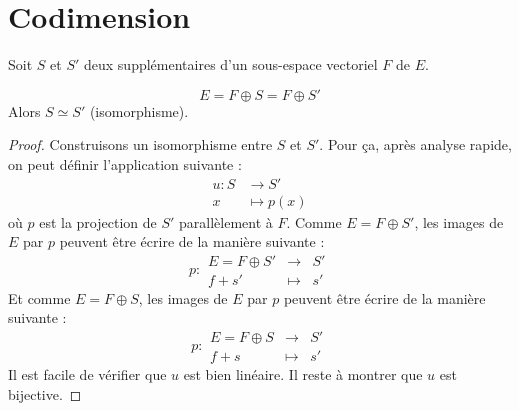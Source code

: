 \documentclass[11pt,a4paper]{report}
\begin{document}
\MakeSwissCover

\tableofcontents

\chapter{Codimension}

\begin{proposition}
    Soit $S$ et $S'$ deux supplémentaires d'un sous-espace vectoriel $F$ de $E$.
    
    $$E = F \oplus S = F \oplus S'$$
    Alors $S \simeq S'$ (isomorphisme).
\end{proposition}

\begin{proof}
    Construisons un isomorphisme entre $S$ et $S'$. Pour ça, après analyse rapide, on peut définir l'application suivante :
    \begin{align*}
        u : S &\longrightarrow S' \\
        x &\longmapsto p(x)
    \end{align*}
    où $p$ est la projection de $S'$ parallèlement à $F$.
    Comme $E = F \oplus S'$, les images de $E$ par $p$ peuvent être écrire de la manière suivante :
    $$p : \begin{matrix} E = F \oplus S' & \longrightarrow & S' \\ f + s' & \longmapsto & s' \end{matrix}$$
    Et comme $E = F \oplus S$, les images de $E$ par $p$ peuvent être écrire de la manière suivante :
    $$p : \begin{matrix} E = F \oplus S & \longrightarrow & S' \\ f + s & \longmapsto & s' \end{matrix}$$
    Il est facile de vérifier que $u$ est bien linéaire. Il reste à montrer que $u$ est bijective.


\end{proof}
\end{document}
